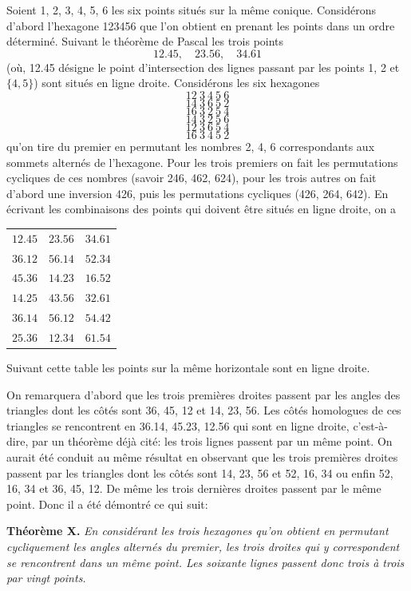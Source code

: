 \documentclass[12pt,a4paper]{article}
\begin{document}
Soient 1, 2, 3, 4, 5, 6 les six points situ\'es sur la m\^eme conique. Consid\'erons d'abord l'hexagone 123456 que l'on obtient en prenant les points dans un ordre d\'etermin\'e. Suivant le th\'eor\`eme de Pascal les trois points
\[
12.45,\quad 23.56,\quad 34.61
\]
(o\`u, 12.45 d\'esigne le point d'intersection des lignes passant par les points 1, 2 et $\{4, 5\}$) sont situ\'es en ligne droite. Consid\'erons les six hexagones
\[
12\ 3\ 4\ 5\ 6
\]
\[
14\ 3\ 6\ 5\ 2
\]
\[
16\ 3\ 2\ 5\ 4
\]
\[
14\ 3\ 2\ 5\ 6
\]
\[
12\ 3\ 6\ 5\ 4
\]
\[
16\ 3\ 4\ 5\ 2
\]
qu'on tire du premier en permutant les nombres 2, 4, 6 correspondants aux sommets altern\'es de l'hexagone. Pour les trois premiers on fait les permutations cycliques de ces nombres (savoir 246, 462, 624), pour les trois autres on fait d'abord une inversion 426, puis les permutations cycliques (426, 264, 642). En \'ecrivant les combinaisons des points qui doivent \^etre situ\'es en ligne droite, on a
\begin{center}
\begin{tabular}{l l l}
$12.45$ & $23.56$ & $34.61$\\
$36.12$ & $56.14$ & $52.34$\\
$45.36$ & $14.23$ & $16.52$\\[2pt]
$14.25$ & $43.56$ & $32.61$\\
$36.14$ & $56.12$ & $54.42$\\
$25.36$ & $12.34$ & $61.54$\\
\end{tabular}
\end{center}
Suivant cette table les points sur la m\^eme horizontale sont en ligne droite.

On remarquera d'abord que les trois premi\`eres droites passent par les angles des triangles dont les c\^ot\'es sont 36, 45, 12 et 14, 23, 56. Les c\^ot\'es homologues de ces triangles se rencontrent en 36.14, 45.23, 12.56 qui sont en ligne droite, c'est-\`a-dire, par un th\'eor\`eme d\'ej\`a cit\'e: les trois lignes passent par un m\^eme point. On aurait \'et\'e conduit au m\^eme r\'esultat en observant que les trois premi\`eres droites passent par les triangles dont les c\^ot\'es sont 14, 23, 56 et 52, 16, 34 ou enfin 52, 16, 34 et 36, 45, 12. De m\^eme les trois derni\`eres droites passent par le m\^eme point. Donc il a \'et\'e d\'emontr\'e ce qui suit:

\textbf{Th\'eor\`eme X.} \emph{En consid\'erant les trois hexagones qu'on obtient en permutant cycliquement les angles altern\'es du premier, les trois droites qui y correspondent se rencontrent dans un m\^eme point. Les soixante lignes passent donc trois \`a trois par vingt points.}
\end{document}
